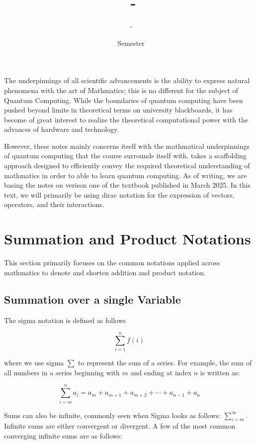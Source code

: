 \documentclass[12pt]{article}
\title{\COURSECODE\ - \FULLCOURSENAME}
\author{\PROFESSORNAME\ - \STUDENTNAME}
\date{\SEMESTER\ Semester \YEAR}
\theoremstyle{plain}
\theoremstyle{definition}
\begin{document}
\maketitle

\hfill

The underpinnings of all scientific advancements is the ability to express natural phenomena with the art of Mathmatics; this is no different for the subject of Quantum Computing. While the boundaries of quantum computing have been pushed beyond limits in theoretical terms on university blackboards, it has become of great interest to realize the theoretical computational power with the advances of hardware and technology. 

However, these notes mainly concerns itself with the mathmatical underpinnings of quantum computing that the course surrounds itself with. \FULLCOURSENAME takes a scaffolding approach designed to efficiently convey the required theoretical understanding of mathmatics in order to able to learn quantum computing. As of writing, we are basing the notes on verison one of the textbook published in March 2025. In this text, we will primarily be using dirac notation for the expression of vectors, operators, and their interactions. 

\tableofcontents

\break


\section{Summation and Product Notations}

This section primarily focuses on the common notations applied across mathmatics to denote and shorten addition and product notation. 

\subsection{Summation over a single Variable}

The sigma notation is defined as follows

$$\sum_{i=1}^{n}f(i)$$

where we use sigma $\sum$ to represent the sum of a series. For example, the sum of all numbers in a series beginning with $m$ and ending at index $n$ is written as:

$$\sum_{i=m}^{n} a_i = a_m + a_{m+1} + a_{m+2} + \cdots + a_{n-1} + a_n$$

Sums can also be infinite, commonly seen when Sigma looks as follows: $\sum^{\infty}_{i=m}$. Infinite sums are either convergent or divergent. A few of the most common converging infinite sums are as follows:
\end{document}
